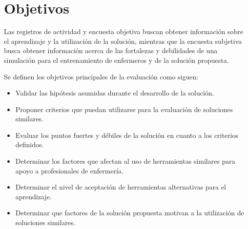 \section{Objetivos}
\label{sec:objetivos}

Las registros de actividad y encuesta objetiva buscan obtener información sobre
el aprendizaje y la utilización de la solución, mientras que la encuesta
subjetiva busca obtener información acerca de las fortalezas y debilidades de
una simulación para el entrenamiento de enfermeros y de la solución propuesta.

Se definen los objetivos principales de la evaluación como siguen:

\begin{itemize}

\item Validar las hipótesis asumidas durante el desarrollo de la
    solución.

\item Proponer criterios que puedan utilizarse para la evaluación de
    soluciones similares.

\item Evaluar los puntos fuertes y débiles de la solución en cuanto a los
    criterios definidos.

\item Determinar los factores que afectan al uso de herramientas similares para
    apoyo a profesionales de enfermería.

\item Determinar el nivel de aceptación de herramientas alternativas para el
    aprendizaje.

\item Determinar que factores de la solución propuesta motivan a la utilización
    de soluciones similares.

\end{itemize}









